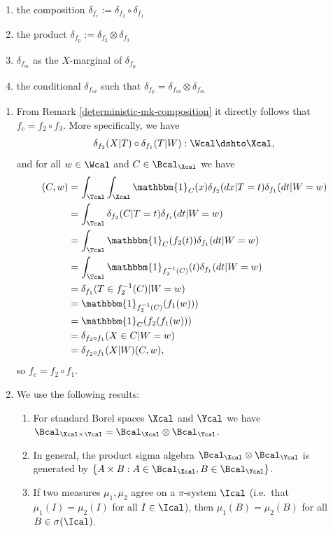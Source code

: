 \begin{enumerate}
\begin{enumerate}
  \item the composition $\delta_{f_c} := \delta_{f_2} \circ \delta_{f_1}$
  \item the product $\delta_{f_p} := \delta_{f_2} \otimes \delta_{f_3}$
  \item $\delta_{f_m}$ as the $X$-marginal of $\delta_{f_p}$
  \item the conditional $\delta_{f_{cd}}$ such that $\delta_{f_p} = \delta_{f_{cd}} \otimes \delta_{f_m}$
\end{enumerate}

\begin{gradedsolution}
  \begin{enumerate}
    \item From Remark \ref*{deterministic-mk-composition} it directly follows that $f_c = f_2 \circ f_3$. More specifically, we have
    $$\delta_{f_2}(X|T)\circ \delta_{f_1}(T|W) : \Wcal \dshto \Xcal,$$ and for all $w\in \Wcal$ and $C\in \Bcal_{\Xcal}$ we have
    \begin{align*}
      [\delta_{f_2}(X|T)\circ \delta_{f_1}(T|W)](C, w) &= \int_\Tcal\int_\Xcal \mathbbm{1}_C(x)\delta_{f_2}(dx|T=t)\delta_{f_1}(dt|W=w) \\
      &= \int_\Tcal \delta_{f_2}(C|T=t)\delta_{f_1}(dt|W=w) \\
      &= \int_\Tcal \mathbbm{1}_C(f_2(t))\delta_{f_1}(dt|W=w) \\
      &= \int_\Tcal \mathbbm{1}_{f_2^{-1}(C)}(t)\delta_{f_1}(dt|W=w) \\
      &= \delta_{f_1}(T\in f_2^{-1}(C)|W=w) \\
      &= \mathbbm{1}_{f_2^{-1}(C)}(f_1(w))) \\
      &= \mathbbm{1}_C(f_2(f_1(w))) \\
      &= \delta_{f_2\circ f_1}(X\in C|W=w) \\
      &= \delta_{f_2\circ f_1}(X|W)(C, w),
    \end{align*}
    so $f_c = f_2\circ f_1$.
    \item We use the following results:
    \begin{enumerate}
      \item 
      For standard Borel spaces $\Xcal$ and $\Ycal$ we have $\Bcal_{\Xcal\times \Ycal} = \Bcal_\Xcal \otimes \Bcal_\Ycal$.
      \item In general, the product sigma algebra $\Bcal_\Xcal \otimes \Bcal_\Ycal$ is generated by $\{A\times B: A\in\Bcal_\Xcal , B\in \Bcal_\Ycal\}$.
      \item If two measures $\mu_1, \mu_2$ agree on a $\pi$-system $\Ical$ (i.e.\ that $\mu_1(I) = \mu_2(I)$ for all $I\in\Ical$), then $\mu_1(B)=\mu_2(B)$ for all $B\in\sigma(\Ical)$.

\end{enumerate}
\end{enumerate}
\end{gradedsolution}
\end{enumerate}
